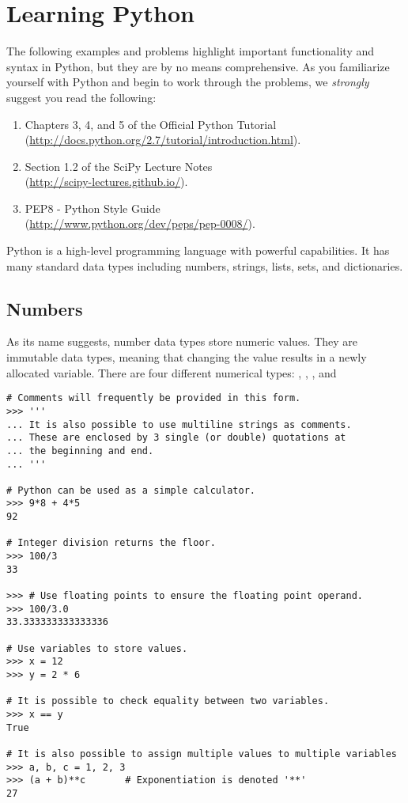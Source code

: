 \section*{Learning Python}
The following examples and problems highlight important functionality and syntax in Python, but they are by no means comprehensive.  As you familiarize yourself with Python and begin to work through the problems, we \emph{strongly} suggest you read the following:
\begin{enumerate}
\item Chapters 3, 4, and 5 of the Official Python Tutorial \\
        (\url{http://docs.python.org/2.7/tutorial/introduction.html}).
\item Section 1.2 of the SciPy Lecture Notes \\
        (\url{http://scipy-lectures.github.io/}).
\item PEP8 - Python Style Guide \\
        (\url{http://www.python.org/dev/peps/pep-0008/}).
\end{enumerate}

Python is a high-level programming language with powerful capabilities. 
It has many standard data types including numbers, strings, lists, sets, and dictionaries. 

\subsection*{Numbers}
\begin{example}
As its name suggests, number data types store numeric values. 
They are immutable data types, meaning that changing the value results in a 
newly allocated variable.
There are four different numerical types: , , 
, and 

\begin{lstlisting}
# Comments will frequently be provided in this form.
>>> '''
... It is also possible to use multiline strings as comments. 
... These are enclosed by 3 single (or double) quotations at 
... the beginning and end. 
... '''

# Python can be used as a simple calculator.
>>> 9*8 + 4*5
92

# Integer division returns the floor.
>>> 100/3
33

>>> # Use floating points to ensure the floating point operand.
>>> 100/3.0
33.333333333333336

# Use variables to store values.
>>> x = 12
>>> y = 2 * 6

# It is possible to check equality between two variables.
>>> x == y
True

# It is also possible to assign multiple values to multiple variables
>>> a, b, c = 1, 2, 3
>>> (a + b)**c       # Exponentiation is denoted '**'
27
\end{lstlisting}
\end{example}


